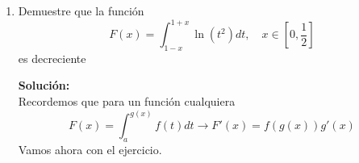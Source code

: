 \documentclass[12pt]{article}
\newenvironment{solucion}
{\begin{mdframed}[backgroundcolor=black!10]
		{\bf Solución:}\\
	}
	{
	\end{mdframed}
}
\newenvironment{preguntas}
{\begin{enumerate}\itemsep12pt
	}
	{
	\end{enumerate}
}
\newcommand{\ev}{\Big|}
\newcommand{\ra}{\rightarrow}
\begin{document}
\begin{preguntas}
\begin{solucion}
\begin{enumerate}[a)]
\item $\displaystyle\int_0^{\frac{1}{\sqrt[]{2}}} \dfrac{x \arcsin(x^2)}{\sqrt[]{1-x^4}}dx$\\
\\
Usando la sustitución
$$u = \arcsin(x^2) \ra du = \dfrac{2x}{\sqrt[]{1-x^4}}dx$$
$$x \in (0, \frac{1}{\sqrt[]{2}}) \ra u \in (0, \frac{\pi}{6})$$
$$\displaystyle\int_0^{\frac{1}{\sqrt[]{2}}} \dfrac{x \arcsin(x^2)}{\sqrt[]{1-x^4}}dx = 
\dfrac{1}{2} \displaystyle\int_0^{\frac{\pi}{6}} udu =
\dfrac{1}{4}u^2 \ev_0^{\frac{\pi}{6}} =
\dfrac{\pi^2}{144}
$$
\item $\displaystyle\int_0^{\ln(2)} e^x\ \sqrt[]{e^x-1}dx$\\
\\
Usando la sustitución
$$u = e^x-1 \ra du = e^xdx$$
$$x \in (0, \ln(2)) \ra u \in (0, 1)$$
$$\displaystyle\int_0^{\ln(2)} e^x\ \sqrt[]{e^x-1}dx=
\displaystyle\int_0^{1} \sqrt[]{u}du = \dfrac{2}{3}u^{3/2} \ev_0^1 = \dfrac{2}{3}
$$
\item $\displaystyle\int_{-3}^{4} |x-1|dx$\\
\\
Al haber un valor absoluto, debemos separar la integral, de manera de ver ambos casos (positivo y negativo) por separado. El cambio de signo del valor absoluto ocurre en $x=1$, por lo que ahí es donde hay que separar la integral, esto es,
$$\displaystyle\int_{-3}^{4} |x-1|dx = 
\displaystyle\int_{-3}^{1} |x-1|dx + 
\displaystyle\int_{1}^{4} |x-1|dx$$
Aplicamos valor absoluto
$$ = 
\displaystyle\int_{-3}^{1} -(x-1)dx + 
\displaystyle\int_{1}^{4} (x-1)dx$$
Resolvemos,
$$= \left(x-\dfrac{x^2}{2}\right)\ev_{-3}^1 +
\left(x-\dfrac{x^2}{2}\right)\ev_{1}^4 = 8 + \dfrac{9}{2} = \dfrac{25}{2}$$
\end{enumerate}
\end{solucion}
\item Demuestre que la función
$$F(x) = \displaystyle\int_{1-x}^{1+x} \ln(t^2)dt, \quad x \in [0, \frac{1}{2}]$$
es decreciente
\begin{solucion}
Recordemos que para un función cualquiera
$$F(x) = \displaystyle\int_a^{g(x)}f(t)dt \ra F'(x) = f(g(x))g'(x)$$
Vamos ahora con el ejercicio.\\


\end{solucion}
\end{preguntas}
\end{document}
